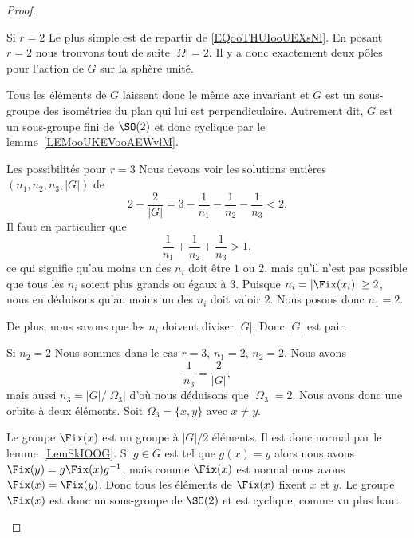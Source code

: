 \begin{proof}
\begin{subproof}
		\item[Si \( r=2 \)]
		Le plus simple est de repartir de \eqref{EQooTHUIooUEXsNl}. En posant \( r=2\) nous trouvons tout de suite \( | \Omega |=2\). Il y a donc exactement deux pôles pour l'action de \( G\) sur la sphère unité.

		Tous les éléments de \( G\) laissent donc le même axe invariant et \( G\) est un sous-groupe des isométries du plan qui lui est perpendiculaire. Autrement dit, \( G\) est un sous-groupe fini de \( \SO(2)\) et donc cyclique par le lemme~\ref{LEMooUKEVooAEWvlM}.

		\item[Les possibilités pour \( r=3 \)]
		Nous devons voir les solutions entières \( (n_1,n_2,n_3,| G |)\) de
		\begin{equation}
			2-\frac{ 2 }{ | G | }=3-\frac{1}{ n_1 }-\frac{1}{ n_2 }-\frac{1}{ n_3 }<2.
		\end{equation}
		Il faut en particulier que
		\begin{equation}
			\frac{1}{ n_1 }+\frac{1}{ n_2 }+\frac{1}{ n_3 }>1,
		\end{equation}
		ce qui signifie qu'au moins un des \( n_i\) doit être \( 1\) ou \( 2\), mais qu'il n'est pas possible que tous les \( n_i\) soient plus grands ou égaux à \( 3\). Puisque \( n_i=| \Fix(x_i) |\geq 2\), nous en déduisons qu'au moins un des \( n_i\) doit valoir \( 2\). Nous posons donc \( n_1=2\).

		De plus, nous savons que les \( n_i\) doivent diviser \( | G |\). Donc \( | G |\) est pair.

		\item[Si \( n_2=2 \)]
		Nous sommes dans le cas \( r=3\), \( n_1=2\), \( n_2=2\). Nous avons
		\begin{equation}
			\frac{1}{ n_3 }=\frac{ 2 }{ | G | },
		\end{equation}
		mais aussi \( n_3=| G |/| \Omega_3 |\) d'où nous déduisons que \( | \Omega_3 |=2\). Nous avons donc une orbite à deux éléments. Soit \( \Omega_3=\{ x,y \}\) avec \( x\neq y\).

		Le groupe \( \Fix(x)\) est un groupe à \( | G |/2\) éléments. Il est donc normal par le lemme~\ref{LemSkIOOG}. Si \( g\in G\) est tel que \( g(x)=y\) alors nous avons \( \Fix(y)=g\Fix(x)g^{-1}\), mais comme \( \Fix(x)\) est normal nous avons \( \Fix(x)=\Fix(y)\). Donc tous les éléments de \( \Fix(x)\) fixent \( x\) et \( y\). Le groupe \( \Fix(x)\) est donc un sous-groupe de \( \SO(2)\) et est cyclique, comme vu plus haut.


\end{subproof}
\end{proof}
